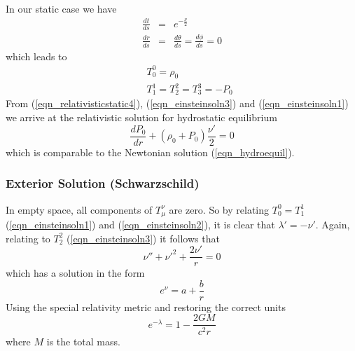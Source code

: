 In our static case we have
\begin{eqnarray}
	\frac{dt}{ds} &=& e^{-\frac{\nu}{2}}
	\label{eqn_relativisticstatic1} \\
	\frac{dr}{ds} &=& \frac{d\theta}{ds} = \frac{d\phi}{ds} = 0
	\label{eqn_relativisticstatic2}
\end{eqnarray}
which leads to
\begin{eqnarray}
	&& T_0^0 =  \rho_0
	\label{eqn_relativisticstatic3} \\
	&& T_1^1 =  T_2^2 = T_3^3 = -P_0
	\label{eqn_relativisticstatic4}
\end{eqnarray}
From (\ref{eqn_relativisticstatic4}), (\ref{eqn_einsteinsoln3}) and (\ref{eqn_einsteinsoln1}) we arrive at the relativistic
solution for hydrostatic equilibrium
\begin{equation}
	\frac{dP_0}{dr} + (\rho_0 + P_0) \frac{\nu'}{2} = 0
	\label{eqn_relativisticpressuredensitysolution}
\end{equation}
which is comparable to the Newtonian solution (\ref{eqn_hydroequil}).

\subsubsection{Exterior Solution (Schwarzschild)}
In empty space, all components of $T_\mu^\nu$ are zero. So by relating $T_0^0=T_1^1$ (\ref{eqn_einsteinsoln1}) and
(\ref{eqn_einsteinsoln2}), it is clear that $\lambda'=-\nu'$. Again, relating to $T_2^2$ (\ref{eqn_einsteinsoln3}) it follows
that
\begin{equation}
	\nu'' + \nu'^2 + \frac{2\nu'}{r} =0
	\label{eqn_relativisticarb1}
\end{equation}
which has a solution in the form
\begin{equation}
	e^\nu = a + \frac{b}{r}
	\label{eqn_relativisticarb2}
\end{equation}
Using the special relativity metric and restoring the correct units
\begin{equation}
	e^{-\lambda} = 1 - \frac{2 G M}{c^2 r}
	\label{eqn_relativisticarb3}
\end{equation}
where $M$ is the total mass.

